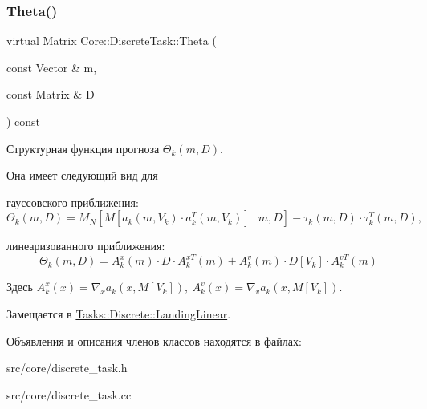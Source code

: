 \subsubsection{\texorpdfstring{Theta()}{Theta()}}
{\footnotesize\ttfamily virtual Matrix Core\+::\+Discrete\+Task\+::\+Theta (\begin{DoxyParamCaption}\item[{const Vector \&}]{m,  }\item[{const Matrix \&}]{D }\end{DoxyParamCaption}) const\hspace{0.3cm}{\ttfamily [pure virtual]}}



Структурная функция прогноза $\Theta_k(m, D)$. 

Она имеет следующий вид для


\begin{DoxyItemize}
\item гауссовского приближения\+: \[\Theta_k(m, D) = M_N[M[a_k(m, V_k)\cdot a_k^T(m, V_k)]\ |\ m, D] - \tau_k(m,D) \cdot \tau_k^T(m, D),\]
\item линеаризованного приближения\+: \[\Theta_k(m, D) = A_k^x(m) \cdot D \cdot A_k^{xT}(m) + A_k^v(m) \cdot D[V_k] \cdot A_k^{v T}(m)\]
\end{DoxyItemize}

Здесь $A_k^x(x) = \nabla_x a_k(x,M[V_k]),\ A_k^v(x) = \nabla_v a_k(x,M[V_k])$. 

Замещается в \hyperlink{class_tasks_1_1_discrete_1_1_landing_linear_a88dda707914dea5698748f445563400f}{Tasks\+::\+Discrete\+::\+Landing\+Linear}.



Объявления и описания членов классов находятся в файлах\+:\begin{DoxyCompactItemize}
\item 
src/core/discrete\+\_\+task.\+h\item 
src/core/discrete\+\_\+task.\+cc\end{DoxyCompactItemize}
